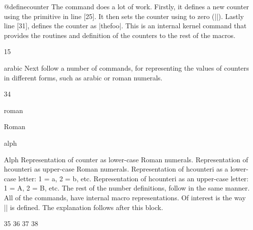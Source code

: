 \begin{docCommand}{@definecounter}{}
The command does a lot of work. Firstly, it defines a new counter using the \tex primitive  in line [25]. It then sets the counter using  to zero (|\z@|). Lastly line [31], defines the counter as |thefoo|. This is an internal kernel command that provides the routines and definition of the counters to the rest of the macros.
\end{docCommand}

\begin{teXXX}
15 \def\@newctr#1[#2]{%
16   \@ifundefined{c@#2}{\@nocounterr{#2}}{\@addtoreset{#1}{#2}}}
\end{teXXX}




\begin{docCommand}{arabic} {}
Next follow a number of commands, for representing the values of counters in different forms, such
as arabic or roman numerals.
\end{docCommand}

\begin{teXXX}
34 \def\arabic#1{\expandafter\@arabic\csname c@#1\endcsname}
\end{teXXX}

\begin{docCommand}{roman} {}
\end{docCommand}
\begin{docCommand}{Roman}{}
\begin{docCommand}{alph}{}
\begin{docCommand}{Alph}{}
Representation of counter as lower-case Roman numerals.  Representation of hcounteri as upper-case Roman numerals.  Representation of hcounteri as a lower-case letter: 1 = a, 2 = b, etc.  Representation of hcounteri as an upper-case letter: 1 = A, 2 = B, etc.
The rest of the number definitions, follow in the same manner.  All of the commands, have internal macro representations. Of interest is the way |\Roman| is defined. The explanation follows after this block.

\end{docCommand}
\end{docCommand}
\end{docCommand}

\begin{teXXX}
35 \def\roman#1{\expandafter\@roman\csname c@#1\endcsname}
36 \def\Roman#1{\expandafter\@Roman\csname c@#1\endcsname}
37 \def\alph#1{\expandafter\@alph\csname c@#1\endcsname}
38 \def\Alph#1{\expandafter\@Alph\csname c@#1\endcsname}
\end{teXXX}

